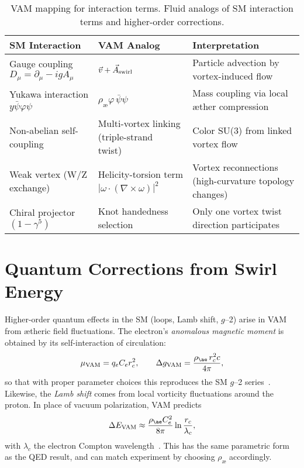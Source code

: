 \documentclass[a4paper,12pt]{article}
\begin{document}
\begin{table}[H]
    \centering
    \begin{tabular}{lll}
        \toprule
        \textbf{SM Interaction} & \textbf{VAM Analog} & \textbf{Interpretation} \\
        \midrule
        Gauge coupling $D_\mu = \partial_\mu - igA_\mu$ & $\vec{v} + \vec{A}_{\rm swirl}$~\cite{vam-lagrangian} & Particle advection by vortex-induced flow \\
        Yukawa interaction $y\bar{\psi}\varphi\psi$ & $\rho_{æ}\varphi\,\bar{\psi}\psi$~\cite{vam-lagrangian} & Mass coupling via local æther compression \\
        Non-abelian self-coupling & Multi-vortex linking (triple-strand twist)~\cite{vam-lagrangian} & Color SU(3) from linked vortex flow \\
        Weak vertex (W/Z exchange) & Helicity-torsion term $|\omega\cdot(\nabla\times\omega)|^2$~\cite{vam-weak} & Vortex reconnections (high-curvature topology changes) \\
        Chiral projector $(1-\gamma^5)$ & Knot handedness selection & Only one vortex twist direction participates~\cite{vam-weak} \\
        \bottomrule
    \end{tabular}
    \caption{VAM mapping for interaction terms. Fluid analogs of SM interaction terms and higher-order corrections.}
    \label{tab:interaction-map2}
\end{table}

\section*{Quantum Corrections from Swirl Energy}

Higher-order quantum effects in the SM (loops, Lamb shift, $g$--2) arise in VAM from ætheric field fluctuations. The electron's \emph{anomalous magnetic moment} is obtained by its self-interaction of circulation:
\begin{equation}
    \mu_{\rm VAM} = q_e C_e r_c^2, \qquad
    \Delta g_{\rm VAM} = \frac{\rho_{æ}\, r_c^2 c}{4\pi},
\end{equation}
so that with proper parameter choices this reproduces the SM $g$--2 series~\cite{vam-g2}. Likewise, the \emph{Lamb shift} comes from local vorticity fluctuations around the proton. In place of vacuum polarization, VAM predicts
\begin{equation}
    \Delta E_{\rm VAM} \approx \frac{\rho_{æ} C_e^2}{8\pi} \ln\frac{r_c}{\lambda_c},
\end{equation}
with $\lambda_c$ the electron Compton wavelength~\cite{vam-lamb}. This has the same parametric form as the QED result, and can match experiment by choosing $\rho_{æ}$ accordingly.
\end{document}
